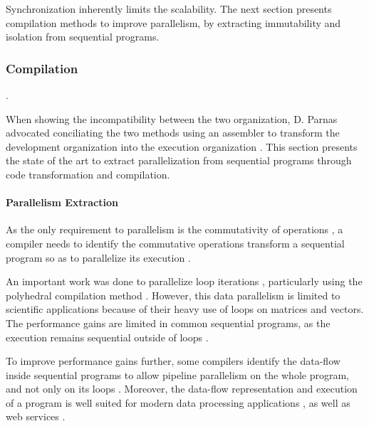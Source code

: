 Synchronization inherently limits the scalability.
The next section presents compilation methods to improve parallelism, by extracting immutability and isolation from sequential programs.

\subsubsection{Compilation} \label{chapter3:software-maintainability:performance:compilation}

.

When showing the incompatibility between the two organization, D. Parnas  advocated conciliating the two methods using an assembler to transform the development organization into the execution organization \cite{Parnas1972}.
This section presents the state of the art to extract parallelization from sequential programs through code transformation and compilation.

\paragraph{Parallelism Extraction}

As the only requirement to parallelism is the commutativity of operations \cite{Rinard1996,Clements2013a}, a compiler needs to identify the commutative operations transform a sequential program so as to parallelize its execution \cite{Rinard1996}.

An important work was done to parallelize loop iterations \cite{Mauras1989,Amarasinghe1995,Banerjee2013,Radoi2014}, particularly using the polyhedral compilation method \cite{Yuki2013,Grosser2011,Trifunovic2010,Bastoul2004}.
However, this data parallelism is limited to scientific applications because of their heavy use of loops on matrices and vectors.
The performance gains are limited in common sequential programs, as the execution remains sequential outside of loops \cite{Amdahl1967,Clements2013a}.

To improve performance gains further, some compilers identify the data-flow inside sequential programs to allow pipeline parallelism on the whole program, and not only on its loops \cite{Beck1991, Li2012}.
Moreover, the data-flow representation and execution of a program is well suited for modern data processing applications \cite{Fernandez2014a}, as well as web services \cite{Salmito2013}.

